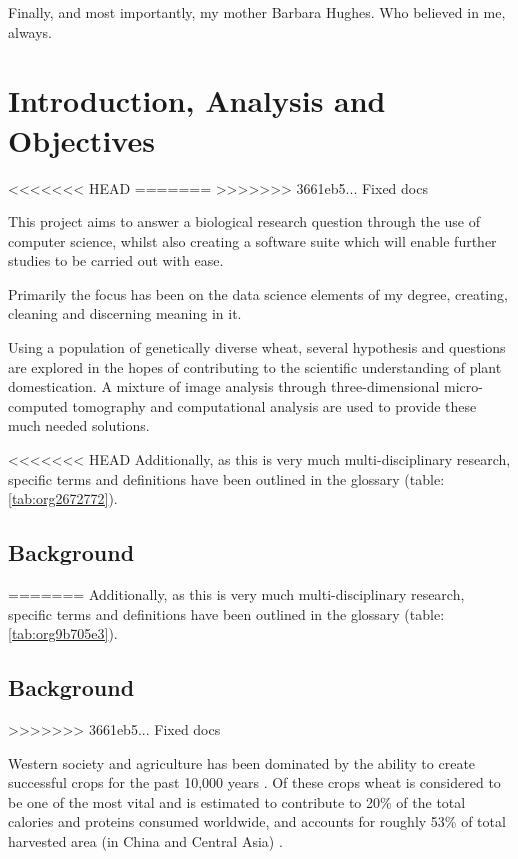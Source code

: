 \documentclass[11pt]{report}
\begin{document}
\vspace{1cm}

Finally, and most importantly, my mother Barbara Hughes. Who believed in me, always.



  \clearpage
  \tableofcontents
  \clearpage
  \listoftables
  \clearpage
  \listoffigures
  \clearpage
  \listofmyequations
  \clearpage
  \listoflistings
  \clearpage

\chapter{Introduction, Analysis and Objectives}
<<<<<<< HEAD
\label{sec:org7af2bf7}
=======
\label{sec:org71ddcae}
>>>>>>> 3661eb5... Fixed docs

This project aims to answer a biological research question through the use of computer science, whilst also creating a software suite which will enable further studies to be carried out with ease.

Primarily the focus has been on the data science elements of my degree, creating, cleaning and discerning meaning in it.

Using a population of genetically diverse wheat, several hypothesis and questions are explored in the hopes of contributing to the scientific understanding of plant domestication. A mixture of image analysis through three-dimensional micro-computed tomography and computational analysis are used to provide these much needed solutions.


<<<<<<< HEAD
Additionally, as this is very much multi-disciplinary research, specific terms and definitions have been outlined in the glossary (table:\ref{tab:org2672772}).

\section{Background}
\label{sec:orgdcc24cc}
=======
Additionally, as this is very much multi-disciplinary research, specific terms and definitions have been outlined in the glossary (table:\ref{tab:org9b705e3}).

\section{Background}
\label{sec:org43bb1b1}
>>>>>>> 3661eb5... Fixed docs

Western society and agriculture has been dominated by the ability to create successful crops for the past 10,000 years \cite{Ozkan2002}. Of these crops wheat is considered to be one of the most vital and is estimated to contribute to 20\% of the total calories and proteins consumed worldwide, and accounts for roughly 53\% of total harvested area (in China and Central Asia) \cite{Shiferaw2013}.
\end{document}
